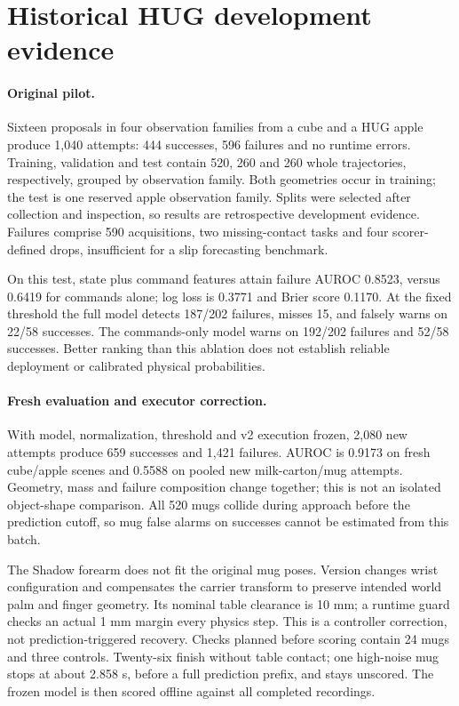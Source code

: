 \documentclass[10pt,letterpaper]{article}
\begin{document}
\section{Historical HUG development evidence}
\paragraph{Original pilot.}
Sixteen proposals in four observation families from a cube and a HUG apple
produce 1,040 attempts: 444 successes, 596 failures and no runtime errors.
Training, validation and test contain 520, 260 and 260 whole trajectories,
respectively, grouped by observation family. Both geometries occur in training;
the test is one reserved apple observation family. Splits were selected after
collection and inspection, so results are retrospective development evidence.
Failures comprise 590 acquisitions, two missing-contact tasks and four
scorer-defined drops, insufficient for a slip forecasting benchmark.

On this test, state plus command features attain failure AUROC 0.8523, versus
0.6419 for commands alone; log loss is 0.3771 and Brier score 0.1170.
At the fixed threshold the full model detects 187/202 failures, misses 15,
and falsely warns on 22/58 successes. The commands-only model warns on
192/202 failures and 52/58 successes. Better ranking than this ablation does
not establish reliable deployment or calibrated physical probabilities.

\paragraph{Fresh evaluation and executor correction.}
With model, normalization, threshold and v2 execution frozen, 2,080 new attempts
produce 659 successes and 1,421 failures. AUROC is 0.9173 on fresh cube/apple
scenes and 0.5588 on pooled new milk-carton/mug attempts. Geometry, mass and
failure composition change together; this is not an isolated object-shape
comparison. All 520 mugs collide during approach before the prediction cutoff,
so mug false alarms on successes cannot be estimated from this batch.

The Shadow forearm does not fit the original mug poses. Version
 changes wrist configuration and
compensates the carrier transform to preserve intended world palm and finger
geometry. Its nominal table clearance is 10 mm; a runtime guard checks an
actual 1 mm margin every physics step. This is a controller correction, not
prediction-triggered recovery. Checks planned before scoring contain 24 mugs
and three controls. Twenty-six finish without table contact; one high-noise
mug stops at about 2.858 s, before a full prediction prefix, and stays unscored.
The frozen model is then scored offline against all completed recordings.
\end{document}
